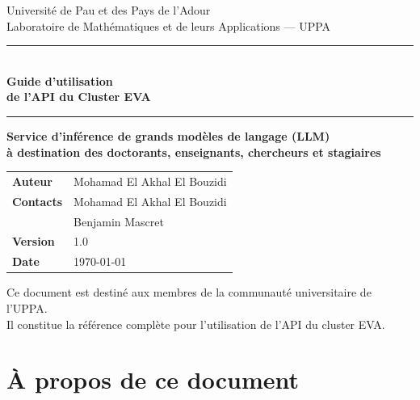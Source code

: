 \documentclass[12pt, a4paper, twoside]{article}
\newcommand{\version}{1.0}
\begin{document}
\begin{titlepage}
  \centering
  \vspace*{2cm}

  {\large Université de Pau et des Pays de l'Adour}\\[0.3cm]
  {\large Laboratoire de Mathématiques et de leurs Applications — UPPA}\\[2cm]

  \rule{\textwidth}{1.5pt}\\[0.4cm]
  {\Huge\bfseries\color{uppaBlue}
    Guide d'utilisation\\[0.3cm]
    de l'API du Cluster EVA
  }\\[0.4cm]
  \rule{\textwidth}{1.5pt}

  \vspace{1.5cm}
  {\large\bfseries Service d'inférence de grands modèles de langage (LLM)\\
  à destination des doctorants, enseignants, chercheurs et stagiaires}

  \vspace{2cm}

  \begin{tabular}{ll}
    \textbf{Auteur}   & Mohamad El Akhal El Bouzidi \\[4pt]
    \textbf{Contacts} & Mohamad El Akhal El Bouzidi \\
                      & Benjamin Mascret \\[4pt]
    \textbf{Version}  & \version \\[4pt]
    \textbf{Date}     & \today \\
  \end{tabular}

  \vfill

  {\small
    Ce document est destiné aux membres de la communauté universitaire de l'UPPA.\\
    Il constitue la référence complète pour l'utilisation de l'API du cluster EVA.
  }
\end{titlepage}

\tableofcontents
\clearpage

\section*{À propos de ce document}
\end{document}
